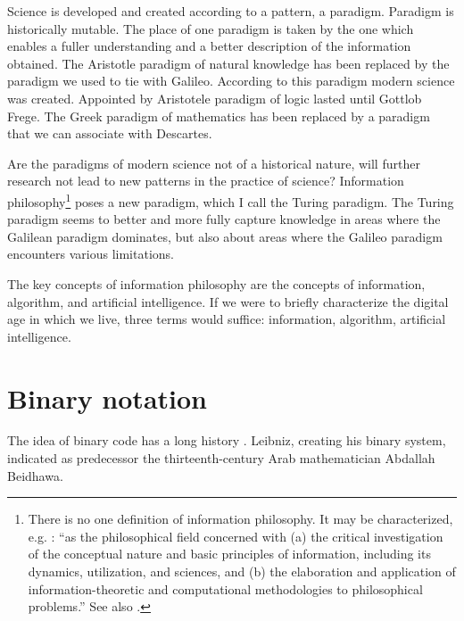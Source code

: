 \documentclass[pdftex,12pt]{article}
\begin{document}
Science is developed and created  according to a pattern, a paradigm. Paradigm is historically mutable. The place of one paradigm is taken by the one which enables a fuller understanding and a better description of the information obtained. The Aristotle paradigm of natural knowledge has been replaced by the paradigm  we used to tie with Galileo. According to this paradigm modern science was created. Appointed by Aristotele paradigm of logic lasted until Gottlob Frege. The Greek paradigm of mathematics has been replaced by a paradigm that we can associate with Descartes.

Are the paradigms of modern science not of a historical nature, will further research not lead to new patterns in the practice of science? Information philosophy\footnote{There is no one definition of information philosophy. It may be characterized, e.g.  \parencite[p.154]{Floridi2009}: ``as  the philosophical field concerned with (a) the critical investigation of the conceptual nature and basic principles of information, including its dynamics, utilization, and sciences, and (b) the elaboration and application of information-theoretic and computational methodologies to philosophical problems.'' See also \parencite{Floridi2002}.} poses a new paradigm, which I call the Turing paradigm. The Turing paradigm seems to better and more fully capture knowledge in areas where the Galilean paradigm dominates, but also about areas where the Galileo paradigm encounters various limitations.

The key concepts of information philosophy are the concepts of information, algorithm, and artificial intelligence. If we were to briefly characterize the digital age in which we live, three terms would suffice: information, algorithm, artificial intelligence.


\section{Binary notation} 

The idea of binary code has a long history \parencite{Ligonniere1992, Trzesicki2006b}. Leibniz, creating his binary system, indicated as predecessor  the thirteenth-century Arab mathematician Abdallah Beidhawa.
\end{document}
